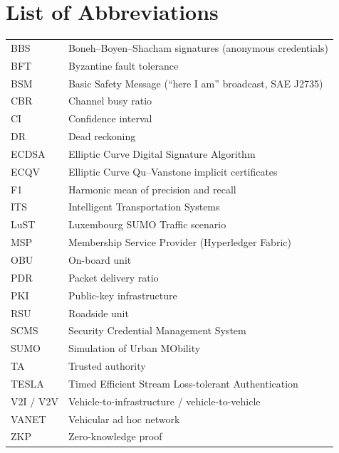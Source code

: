 \chapter*{List of Abbreviations}
\begin{tabular}{@{}p{3cm}p{11cm}@{}}
BBS & Boneh--Boyen--Shacham signatures (anonymous credentials)\\
BFT & Byzantine fault tolerance\\
BSM & Basic Safety Message (``here I am'' broadcast, SAE J2735)\\
CBR & Channel busy ratio\\
CI & Confidence interval\\
DR & Dead reckoning\\
ECDSA & Elliptic Curve Digital Signature Algorithm\\
ECQV & Elliptic Curve Qu--Vanstone implicit certificates\\
F1 & Harmonic mean of precision and recall\\
ITS & Intelligent Transportation Systems\\
LuST & Luxembourg SUMO Traffic scenario\\
MSP & Membership Service Provider (Hyperledger Fabric)\\
OBU & On-board unit\\
PDR & Packet delivery ratio\\
PKI & Public-key infrastructure\\
RSU & Roadside unit\\
SCMS & Security Credential Management System\\
SUMO & Simulation of Urban MObility\\
TA & Trusted authority\\
TESLA & Timed Efficient Stream Loss-tolerant Authentication\\
V2I / V2V & Vehicle-to-infrastructure / vehicle-to-vehicle\\
VANET & Vehicular ad hoc network\\
ZKP & Zero-knowledge proof\\
\end{tabular}
